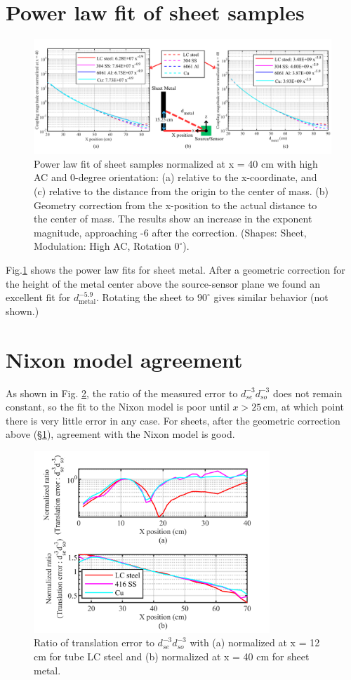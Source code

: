 \documentclass{article}
\begin{document}
\section{Power law fit of sheet samples}
\label{supplement:sheet_fitting}
\begin{figure}[!htbp]
\centerline{\includegraphics[width= 7in]{chaicS4.png}}
\caption{Power law fit of sheet samples normalized at x = 40 cm with high AC and 0-degree orientation: (a) relative to the x-coordinate, and (c) relative to the distance from the origin to the center of mass. (b) Geometry correction from the x-position to the actual distance to the center of mass. The results show an increase in the exponent magnitude, approaching -6 after the correction. (Shapes: Sheet, Modulation: High AC, Rotation $0^\circ$).}
\label{coupling_sheet_fit}
\end{figure} 

Fig.\ref{coupling_sheet_fit} shows the power law fits for sheet metal. After a geometric correction for the height of the metal center above the source-sensor plane we found an excellent fit for $d_{\text{metal}}^{-5.9}$. Rotating the sheet to $90^\circ$ gives similar behavior (not shown.)

\section{Nixon model agreement}
\label{supplement:Nixon_ratio}
As shown in Fig. \ref{Nixon_ratio}, the ratio of the measured error to $d_{se}^{-3}d_{so}^{-3}$ does not remain constant, so the fit to the Nixon model\cite{nixon_effects_1998} is poor until $x>25$\,cm, at which point there is very little error in any case. For sheets, after the geometric correction above (\S\ref{supplement:sheet_fitting}), agreement with the Nixon model is good.

\begin{figure}[!htbp]
\centerline{\includegraphics[width=3.5in]{chaicS5.png}}
\caption{Ratio of translation error to ${d_{se}^{-3} d_{so}^{-3}}$ with (a) normalized at x = 12 cm for tube LC steel and (b) normalized at x = 40 cm for sheet metal.}
\label{Nixon_ratio}
\end{figure} 
\end{document}

